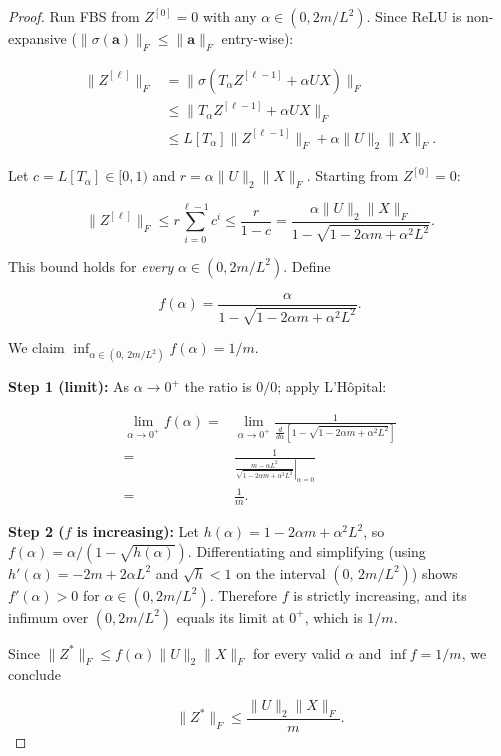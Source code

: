 \documentclass[twoside]{article}
\begin{document}
\begin{proof}
    
Run FBS from $Z^{[0]} = 0$ with any $\alpha \in (0, 2m/L^2)$. Since ReLU is non-expansive
($\|\sigma(\mathbf{a})\|_F \leq \|\mathbf{a}\|_F$ entry-wise):

\begin{align*}
\|Z^{[\ell]}\|_F 
&= \|\sigma(T_\alpha Z^{[\ell-1]} + \alpha UX)\|_F \\
&\leq \|T_\alpha Z^{[\ell-1]} + \alpha UX\|_F \\
&\leq L[T_\alpha]\|Z^{[\ell-1]}\|_F + \alpha\|U\|_2\|X\|_F.
\end{align*}

Let $c = L[T_\alpha] \in [0, 1)$ and $r = \alpha\|U\|_2\|X\|_F$. Starting from $Z^{[0]} = 0$:

$$\|Z^{[\ell]}\|_F \leq r \sum_{i=0}^{\ell-1} c^i \leq \frac{r}{1 - c} = \frac{\alpha\|U\|_2\|X\|_F}{1 - \sqrt{1 - 2\alpha m + \alpha^2 L^2}}.$$

This bound holds for \emph{every} $\alpha \in (0, 2m/L^2)$. Define

$$f(\alpha) = \frac{\alpha}{1 - \sqrt{1 - 2\alpha m + \alpha^2 L^2}}.$$

We claim $\inf_{\alpha \in (0,\,2m/L^2)} f(\alpha) = 1/m$.

\textbf{Step 1 (limit):} As $\alpha \to 0^+$ the ratio is $0/0$; apply L'Hôpital:

\begin{align*}
    \lim_{\alpha\to 0^+} f(\alpha) =& \lim_{\alpha\to 0^+} \frac{1}{\frac{d}{d\alpha}[1-\sqrt{1-2\alpha m+\alpha^2 L^2}]} \\
    =& \frac{1}{\left.\frac{m - \alpha L^2}{\sqrt{1-2\alpha m+\alpha^2 L^2}}\right|_{\alpha=0}}\\ 
    =& \frac{1}{m}.
\end{align*}

\textbf{Step 2 ($f$ is increasing):} Let $h(\alpha) = 1 - 2\alpha m + \alpha^2 L^2$, so $f(\alpha) = \alpha/(1-\sqrt{h(\alpha)})$. Differentiating and simplifying (using $h'(\alpha) = -2m + 2\alpha L^2$ and $\sqrt{h} < 1$ on the interval $(0,\,2m/L^2)$) shows $f'(\alpha) > 0$ for $\alpha \in (0, 2m/L^2)$. Therefore $f$ is strictly increasing, and its infimum over $(0, 2m/L^2)$ equals its limit at $0^+$, which is $1/m$.

Since $\|Z^*\|_F \leq f(\alpha)\|U\|_2\|X\|_F$ for every valid $\alpha$ and $\inf f = 1/m$, we conclude

$$\|Z^*\|_F \leq \frac{\|U\|_2\|X\|_F}{m}.$$
\end{proof}
\end{document}
